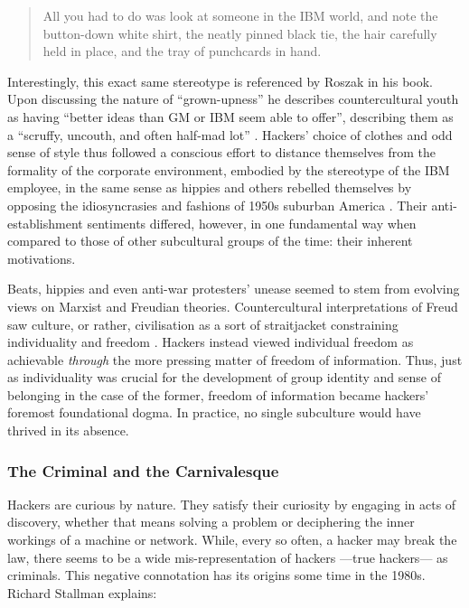 \begin{quote}
All you had to do was look at someone in the IBM world, and note the button-down white shirt, the neatly pinned black tie, the hair carefully held in place, and the tray of punchcards in hand. \citep[p.42]{levy84}
\end{quote}

Interestingly, this exact same stereotype is referenced by Roszak in his book. Upon discussing the nature of ``grown-upness'' he describes countercultural youth as having ``better ideas than GM or IBM seem able to offer'', describing them as a ``scruffy, uncouth, and often half-mad lot'' \citep[p.32]{roszak69}. Hackers' choice of clothes and odd sense of style thus followed a conscious effort to distance themselves from the formality of the corporate environment, embodied by the stereotype of the IBM employee, in the same sense as hippies and others rebelled themselves by opposing the idiosyncrasies and fashions of 1950s suburban America \citep[p.34]{heath05}. Their anti-establishment sentiments differed, however, in one fundamental way when compared to those of other subcultural groups of the time: their inherent motivations.

Beats, hippies and even anti-war protesters' unease seemed to stem from evolving views on Marxist and Freudian theories. Countercultural interpretations of Freud saw culture, or rather, civilisation as a sort of straitjacket constraining individuality and freedom \citep{heath05}. Hackers instead viewed individual freedom as achievable \emph{through} the more pressing matter of freedom of information. Thus, just as individuality was crucial for the development of group identity and sense of belonging in the case of the former, freedom of information became hackers' foremost foundational dogma. In practice, no single subculture would have thrived in its absence.




\subsubsection{The Criminal and the Carnivalesque}

Hackers are curious by nature. They satisfy their curiosity by engaging in acts of discovery, whether that means solving a problem or deciphering the inner workings of a machine or network. While, every so often, a hacker may break the law, there seems to be a wide mis-representation of hackers ---true hackers--- as criminals. This negative connotation has its origins some time in the 1980s. Richard Stallman \citeyearpar{stallman02b} explains: 

